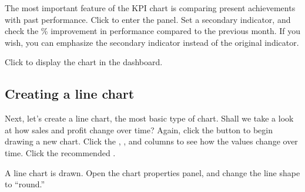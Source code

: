 \documentclass[letterpaper,10pt,english]{sphinxmanual}
\begin{document}
The most important feature of the KPI chart is comparing present achievements with past performance. Click  to enter the  panel. Set a secondary indicator, and check the \% improvement in performance compared to the previous month. If you wish, you can emphasize the secondary indicator instead of the original indicator.
\begin{quote}

\begin{figure}[H]
\centering

\noindent{}
\end{figure}
\end{quote}

Click  to display the chart in the dashboard.
\begin{quote}

\begin{figure}[H]
\centering

\noindent{}
\end{figure}
\end{quote}


\subsection{Creating a line chart}
\label{\detokenize{discovery/part00/step3:id2}}
Next, let’s create a line chart, the most basic type of chart. Shall we take a look at how sales and profit change over time? Again, click the  button to begin drawing a new chart. Click the , , and  columns to see how the values change over time. Click the recommended .
\begin{quote}

\begin{figure}[H]
\centering

\noindent{}
\end{figure}
\end{quote}

A line chart is drawn. Open the chart properties panel, and change the line shape to “round.”
\begin{quote}

\begin{figure}[H]
\centering

\noindent{}
\end{figure}
\end{quote}
\end{document}
